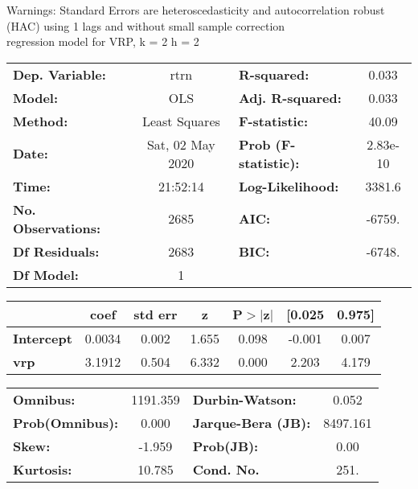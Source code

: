 Warnings: \newline
 [1] Standard Errors are heteroscedasticity and autocorrelation robust (HAC) using 1 lags and without small sample correction\\ 

regression model for VRP, k = 2 h = 2\begin{center}
\begin{tabular}{lclc}
\toprule
\textbf{Dep. Variable:}    &       rtrn       & \textbf{  R-squared:         } &     0.033   \\
\textbf{Model:}            &       OLS        & \textbf{  Adj. R-squared:    } &     0.033   \\
\textbf{Method:}           &  Least Squares   & \textbf{  F-statistic:       } &     40.09   \\
\textbf{Date:}             & Sat, 02 May 2020 & \textbf{  Prob (F-statistic):} &  2.83e-10   \\
\textbf{Time:}             &     21:52:14     & \textbf{  Log-Likelihood:    } &    3381.6   \\
\textbf{No. Observations:} &        2685      & \textbf{  AIC:               } &    -6759.   \\
\textbf{Df Residuals:}     &        2683      & \textbf{  BIC:               } &    -6748.   \\
\textbf{Df Model:}         &           1      & \textbf{                     } &             \\
\bottomrule
\end{tabular}
\begin{tabular}{lcccccc}
                   & \textbf{coef} & \textbf{std err} & \textbf{z} & \textbf{P$> |$z$|$} & \textbf{[0.025} & \textbf{0.975]}  \\
\midrule
\textbf{Intercept} &       0.0034  &        0.002     &     1.655  &         0.098        &       -0.001    &        0.007     \\
\textbf{vrp}       &       3.1912  &        0.504     &     6.332  &         0.000        &        2.203    &        4.179     \\
\bottomrule
\end{tabular}
\begin{tabular}{lclc}
\textbf{Omnibus:}       & 1191.359 & \textbf{  Durbin-Watson:     } &    0.052  \\
\textbf{Prob(Omnibus):} &   0.000  & \textbf{  Jarque-Bera (JB):  } & 8497.161  \\
\textbf{Skew:}          &  -1.959  & \textbf{  Prob(JB):          } &     0.00  \\
\textbf{Kurtosis:}      &  10.785  & \textbf{  Cond. No.          } &     251.  \\
\bottomrule
\end{tabular}
\end{center}

